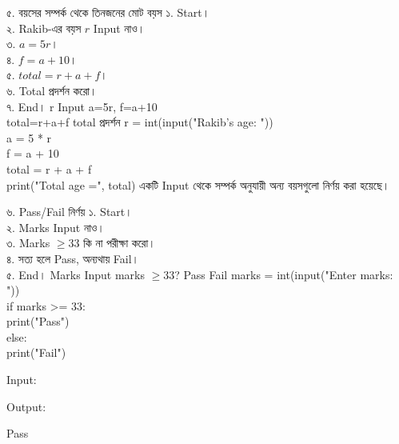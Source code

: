 
\exerciseTable
{৫. বয়সের সম্পর্ক থেকে তিনজনের মোট বয়স}
{
১. Start।\\
২. Rakib-এর বয়স \(r\) Input নাও।\\
৩. \(a=5r\)।\\
৪. \(f=a+10\)।\\
৫. \(total=r+a+f\)।\\
৬. Total প্রদর্শন করো।\\
৭. End।
}
{
\linearflow
{r Input}
{a=5r,\; f=a+10\\total=r+a+f}
{total প্রদর্শন}
}
{
r = int(input("Rakib's age: "))\\
a = 5 * r\\
f = a + 10\\
total = r + a + f\\
print("Total age =", total)
}
{
একটি Input থেকে সম্পর্ক অনুযায়ী অন্য বয়সগুলো নির্ণয় করা হয়েছে।
}




\exerciseTable
{৬. Pass/Fail নির্ণয়}
{
১. Start।\\
২. Marks Input নাও।\\
৩. Marks \(\ge33\) কি না পরীক্ষা করো।\\
৪. সত্য হলে Pass, অন্যথায় Fail।\\
৫. End।
}
{
\binaryflow
{Marks Input}
{marks \(\ge33\)?}
{Pass}
{Fail}
}
{
marks = int(input("Enter marks: "))\\[0.5mm]
if marks >= 33:\\
\hspace*{4mm}print("Pass")\\
else:\\
\hspace*{4mm}print("Fail")
}
{
Input:
\textenglish{}

\medskip

Output:

\textenglish{\ttfamily Pass}
}


